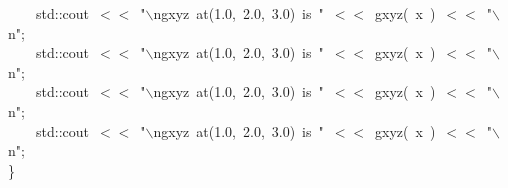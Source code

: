 \documentclass[9pt,onside,a4paper]{article}
\newcommand{\hlstd}[1]{\textcolor[rgb]{0.2,0,0.4}{#1}}
\newcommand{\hlesc}[1]{\textcolor[rgb]{0.65,0.09,0.38}{#1}}
\newcommand{\hlstr}[1]{\textcolor[rgb]{0.09,0.38,0.65}{#1}}
\newcommand{\hlopt}[1]{\textcolor[rgb]{0.33,0.33,0.33}{#1}}
\newcommand{\hlkwd}[1]{\textcolor[rgb]{0.82,0.11,0.93}{#1}}
\begin{document}
{\hlstd{}\hlstd{\ \ \ \ }\hlstd{std}\hlopt{::}\hlstd{cout\ }\hlopt{$<$$<$\ }\hlstd{}\hlstr{"}\hlesc{$\backslash$n}\hlstr{gxyz\ at(1.0,\ 2.0,\ 3.0)\ is\ "}\hlstd{\ }\hlopt{$<$$<$\ }\hlstd{}\hlkwd{gxyz}\hlstd{}\hlopt{(\ }\hlstd{x\ }\hlopt{)\ $<$$<$\ }\hlstd{}\hlstr{"}\hlesc{$\backslash$n}\hlstr{"}\hlstd{}\hlopt{;}\hspace*{\fill}\\
\hlstd{}\hlstd{\ \ \ \ }\hlstd{std}\hlopt{::}\hlstd{cout\ }\hlopt{$<$$<$\ }\hlstd{}\hlstr{"}\hlesc{$\backslash$n}\hlstr{gxyz\ at(1.0,\ 2.0,\ 3.0)\ is\ "}\hlstd{\ }\hlopt{$<$$<$\ }\hlstd{}\hlkwd{gxyz}\hlstd{}\hlopt{(\ }\hlstd{x\ }\hlopt{)\ $<$$<$\ }\hlstd{}\hlstr{"}\hlesc{$\backslash$n}\hlstr{"}\hlstd{}\hlopt{;}\hspace*{\fill}\\
\hlstd{}\hlstd{\ \ \ \ }\hlstd{std}\hlopt{::}\hlstd{cout\ }\hlopt{$<$$<$\ }\hlstd{}\hlstr{"}\hlesc{$\backslash$n}\hlstr{gxyz\ at(1.0,\ 2.0,\ 3.0)\ is\ "}\hlstd{\ }\hlopt{$<$$<$\ }\hlstd{}\hlkwd{gxyz}\hlstd{}\hlopt{(\ }\hlstd{x\ }\hlopt{)\ $<$$<$\ }\hlstd{}\hlstr{"}\hlesc{$\backslash$n}\hlstr{"}\hlstd{}\hlopt{;}\hspace*{\fill}\\
\hlstd{}\hlstd{\ \ \ \ }\hlstd{std}\hlopt{::}\hlstd{cout\ }\hlopt{$<$$<$\ }\hlstd{}\hlstr{"}\hlesc{$\backslash$n}\hlstr{gxyz\ at(1.0,\ 2.0,\ 3.0)\ is\ "}\hlstd{\ }\hlopt{$<$$<$\ }\hlstd{}\hlkwd{gxyz}\hlstd{}\hlopt{(\ }\hlstd{x\ }\hlopt{)\ $<$$<$\ }\hlstd{}\hlstr{"}\hlesc{$\backslash$n}\hlstr{"}\hlstd{}\hlopt{;}\hspace*{\fill}\\
\hlstd{}\hlopt{\}}\hspace*{\fill}\\
}
\normalfont
\normalsize
\end{document}
